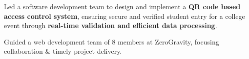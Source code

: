 \begin{zitemize}
    \item Led a software development team to design and implement a \textbf{QR code based access control system}, ensuring secure and verified student entry for a college event through \textbf{real-time validation and efficient data processing}.

    \item Guided a web development team of 8 members at ZeroGravity, focusing collaboration \& timely project delivery.
\end{zitemize}